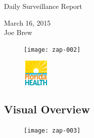 \documentclass[12pt]{article}
\begin{document}

\fancyhfoffset[O,O]{0pt}

\begin{center}
\begin{huge}
Daily Surveillance Report \\
\end{huge}
March 16, 2015 \\
Joe Brew

\end{center}





\begin{figure}[H]
\begin{center}
\texttt{[image: zap-002]}
\end{center}
\end{figure}
\vspace{20 mm}







  
\tableofcontents

\begin{center}

\vspace{30 mm}


\begin{figure}[ht!]
\centering
\includegraphics[height=50, width=50]{doh.png}
\label{overflow}
\end{figure}
\end{center}

\begin{center}
\section*{Visual Overview}
\end{center}
\begin{figure}[H]
\begin{center}
\texttt{[image: zap-003]}
\end{center}
\end{figure}
\vspace{-10mm}
\end{document}
